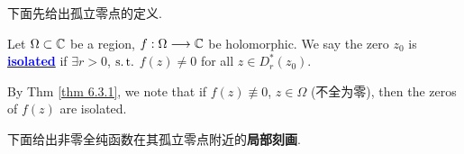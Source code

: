 	\vspace{2em}
	下面先给出孤立零点的定义.
	\begin{defn}\label{def 7.1.1}
		Let $\Omega \subset \mathbb{C}$ be a region, $f : \Omega \longrightarrow \mathbb{C}$ be holomorphic. We say the zero $z_0$ is \underline{\textcolor{blue}{\textbf{isolated}}} if $\exists r > 0$, $\operatorname{s.t.}$ $f(z) \neq 0$ for all $z \in D_{r}^{*}(z_0)$. 
		
		\begin{rmk}
			By Thm \ref{thm 6.3.1}, we note that if $f(z) \not\equiv 0$, $z \in \Omega$ (不全为零), then the zeros of $f(z)$ are isolated.
		\end{rmk}
	\end{defn}

	\vspace{2em}
	下面给出非零全纯函数在其孤立零点附近的\textbf{局部刻画}.
